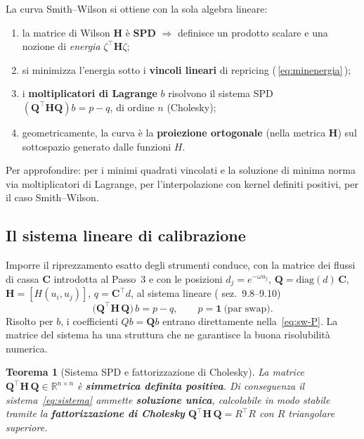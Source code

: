 \documentclass[11pt,a4paper]{article}
\theoremstyle{plain}
\newtheorem{teorema}{Teorema}[section]
\theoremstyle{definition}
\theoremstyle{remark}
\newcommand{\Qmat}{\mathbf{Q}}
\newcommand{\Hmat}{\mathbf{H}}
\newcommand{\transp}{^{\!\top}}
\begin{document}
\begin{keybox}
La curva Smith--Wilson si ottiene con la sola algebra lineare:
\begin{enumerate}
  \item la matrice di Wilson $\Hmat$ \`e \textbf{SPD} $\Rightarrow$ definisce un prodotto
        scalare e una nozione di \emph{energia} $\zeta\transp\Hmat\zeta$;
  \item si minimizza l'energia sotto i \textbf{vincoli lineari} di repricing
        (\,\eqref{eq:minenergia}\,);
  \item i \textbf{moltiplicatori di Lagrange} $b$ risolvono il sistema SPD
        $(\Qmat\transp\Hmat\Qmat)b = p-q$, di ordine $n$ (Cholesky);
  \item geometricamente, la curva \`e la \textbf{proiezione ortogonale} (nella metrica
        $\Hmat$) sul sottospazio generato dalle funzioni $H$.
\end{enumerate}
Per approfondire: \cite{boyd2018} per i minimi quadrati vincolati e la soluzione di minima
norma via moltiplicatori di Lagrange, \cite{fasshauer2007} per l'interpolazione con kernel
definiti positivi, \cite{lageras2016} per il caso Smith--Wilson.
\end{keybox}

\subsection{Il sistema lineare di calibrazione}

Imporre il riprezzamento esatto degli strumenti conduce, con la matrice dei flussi di cassa
$\mathbf{C}$ introdotta al Passo~3 e con le posizioni
$d_j = e^{-\omega u_j}$, $\Qmat = \mathrm{diag}(d)\,\mathbf{C}$,
$\Hmat = [H(u_i,u_j)]$, $q = \mathbf{C}\transp d$, al sistema lineare
(\cite{eiopa2025} sez.~9.8--9.10)
\begin{equation}
  \bigl(\Qmat\transp \Hmat\, \Qmat\bigr)\, b = p - q,
  \qquad p = \mathbf{1}\ \text{(par swap)} .
  \label{eq:sistema}
\end{equation}
Risolto per $b$, i coefficienti $Qb = \Qmat b$ entrano direttamente
nella~\eqref{eq:sw-P}. La matrice del sistema ha una struttura che ne garantisce la buona
risolubilit\`a numerica.

\begin{teorema}[Sistema SPD e fattorizzazione di Cholesky]
\label{thm:spd}
La matrice $\Qmat\transp \Hmat\, \Qmat \in \mathbb{R}^{n\times n}$ \`e \textbf{simmetrica
definita positiva}. Di conseguenza il sistema~\eqref{eq:sistema} ammette \textbf{soluzione
unica}, calcolabile in modo stabile tramite la \textbf{fattorizzazione di Cholesky}
$\Qmat\transp \Hmat\,\Qmat = R\transp R$ con $R$ triangolare superiore.
\end{teorema}
\end{document}
